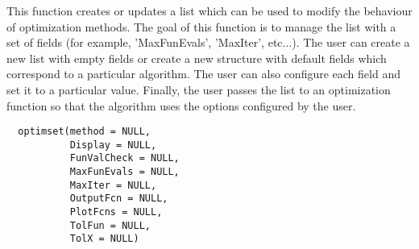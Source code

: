 %
\begin{Description}\relax
This function creates or updates a list which can be used to modify
the behaviour of optimization methods. The goal of this function is to manage
the  list with a set of fields (for example, 'MaxFunEvals',
'MaxIter', etc...). The user can create a new list with empty fields or
create a new structure with default fields which correspond to a particular
algorithm. The user can also configure each field and set it to a particular
value. Finally, the user passes the list to an optimization function so
that the algorithm uses the options configured by the user.
\end{Description}
%
\begin{Usage}
\begin{verbatim}
  optimset(method = NULL,
           Display = NULL,
           FunValCheck = NULL,
           MaxFunEvals = NULL,
           MaxIter = NULL,
           OutputFcn = NULL,
           PlotFcns = NULL,
           TolFun = NULL,
           TolX = NULL)
\end{verbatim}
\end{Usage}
%
